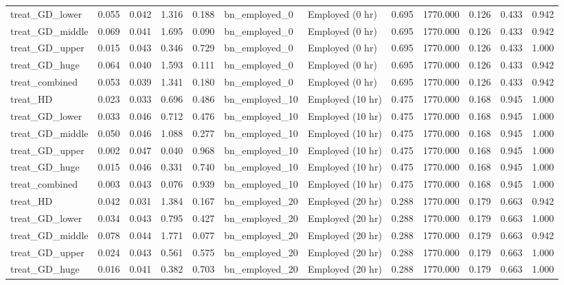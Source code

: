 \begin{tabular}{llllllllllll}
treat\_GD\_lower & 0.055 & 0.042 & 1.316 & 0.188 & bn\_employed\_0 & Employed (0 hr) & 0.695 & 1770.000 & 0.126 & 0.433 & 0.942 \\
treat\_GD\_middle & 0.069 & 0.041 & 1.695 & 0.090 & bn\_employed\_0 & Employed (0 hr) & 0.695 & 1770.000 & 0.126 & 0.433 & 0.942 \\
treat\_GD\_upper & 0.015 & 0.043 & 0.346 & 0.729 & bn\_employed\_0 & Employed (0 hr) & 0.695 & 1770.000 & 0.126 & 0.433 & 1.000 \\
treat\_GD\_huge & 0.064 & 0.040 & 1.593 & 0.111 & bn\_employed\_0 & Employed (0 hr) & 0.695 & 1770.000 & 0.126 & 0.433 & 0.942 \\
treat\_combined & 0.053 & 0.039 & 1.341 & 0.180 & bn\_employed\_0 & Employed (0 hr) & 0.695 & 1770.000 & 0.126 & 0.433 & 0.942 \\
treat\_HD & 0.023 & 0.033 & 0.696 & 0.486 & bn\_employed\_10 & Employed (10 hr) & 0.475 & 1770.000 & 0.168 & 0.945 & 1.000 \\
treat\_GD\_lower & 0.033 & 0.046 & 0.712 & 0.476 & bn\_employed\_10 & Employed (10 hr) & 0.475 & 1770.000 & 0.168 & 0.945 & 1.000 \\
treat\_GD\_middle & 0.050 & 0.046 & 1.088 & 0.277 & bn\_employed\_10 & Employed (10 hr) & 0.475 & 1770.000 & 0.168 & 0.945 & 1.000 \\
treat\_GD\_upper & 0.002 & 0.047 & 0.040 & 0.968 & bn\_employed\_10 & Employed (10 hr) & 0.475 & 1770.000 & 0.168 & 0.945 & 1.000 \\
treat\_GD\_huge & 0.015 & 0.046 & 0.331 & 0.740 & bn\_employed\_10 & Employed (10 hr) & 0.475 & 1770.000 & 0.168 & 0.945 & 1.000 \\
treat\_combined & 0.003 & 0.043 & 0.076 & 0.939 & bn\_employed\_10 & Employed (10 hr) & 0.475 & 1770.000 & 0.168 & 0.945 & 1.000 \\
treat\_HD & 0.042 & 0.031 & 1.384 & 0.167 & bn\_employed\_20 & Employed (20 hr) & 0.288 & 1770.000 & 0.179 & 0.663 & 0.942 \\
treat\_GD\_lower & 0.034 & 0.043 & 0.795 & 0.427 & bn\_employed\_20 & Employed (20 hr) & 0.288 & 1770.000 & 0.179 & 0.663 & 1.000 \\
treat\_GD\_middle & 0.078 & 0.044 & 1.771 & 0.077 & bn\_employed\_20 & Employed (20 hr) & 0.288 & 1770.000 & 0.179 & 0.663 & 0.942 \\
treat\_GD\_upper & 0.024 & 0.043 & 0.561 & 0.575 & bn\_employed\_20 & Employed (20 hr) & 0.288 & 1770.000 & 0.179 & 0.663 & 1.000 \\
treat\_GD\_huge & 0.016 & 0.041 & 0.382 & 0.703 & bn\_employed\_20 & Employed (20 hr) & 0.288 & 1770.000 & 0.179 & 0.663 & 1.000 \\

\end{tabular}
